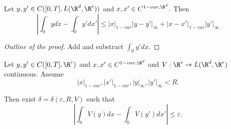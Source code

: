 \begin{prop}
   Let $y, y' \in C([0,T], L(\R^d, \R^e))$ and $x,x' \in C^{1-var, \R^d}.$ Then
\begin{equation}
    |\int_0^\cdot ydx - \int_0^\cdot y'dx'| \leq |x|_{1-var} |y - y'|_\infty + |x - x'|_{1-var} |y'|_\infty 
\end{equation} 
\end{prop}
\begin{proof}[Outline of the proof]
    Add and substract $\int_0^\cdot y'dx.$
\end{proof}

\begin{corollary}
     Let $y, y' \in C([0,T], \R^e)$ and $x,x' \in C^{1-var, \R^d}$ and $V: \R^e \rightarrow L(\R^d, \R^e)$ continuous. 
     Assume
     \begin{equation}
        |x|_{1-var}, |x'|_{1-var}, |y|_\infty, |y'|_\infty < R.
     \end{equation} 

     Then exist $\delta = \delta(\varepsilon, R, V)$ such that
     \begin{equation}
        |\int_0^\cdot V(y)dx - \int_0^\cdot V(y')dx'| \leq \varepsilon.
     \end{equation}
\end{corollary}
